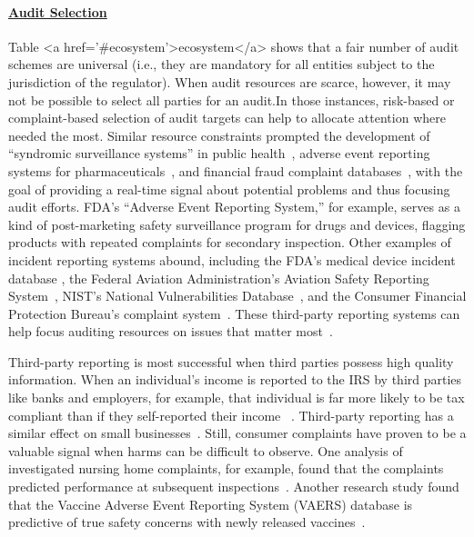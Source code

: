 \documentclass[sigconf]{acmart}
\begin{document}
\paragraph{\underline{Audit Selection}} Table <a href='#ecosystem'>ecosystem</a> shows that a fair number of audit schemes are universal (i.e., they are mandatory for all entities subject to the jurisdiction of the regulator). When audit resources are scarce, however, it may not be possible to select all parties for an audit.In those instances, risk-based or complaint-based selection of audit targets can help to allocate attention where needed the most. Similar resource constraints prompted the development of “syndromic surveillance systems” in public health~\cite{henning2004syndromic}, adverse event reporting systems for pharmaceuticals~\cite{sakaeda2013data}, and financial fraud complaint databases~\cite{littwin2014process}, with the goal of providing a real-time signal about potential problems and thus focusing audit efforts. FDA’s “Adverse Event Reporting System,” for example, serves as a kind of post-marketing safety surveillance program for drugs and devices, flagging products with repeated complaints for secondary inspection. Other examples of incident reporting systems abound, including the FDA’s medical device incident database \cite{maude}, the Federal Aviation Administration’s Aviation Safety Reporting System~\cite{noauthoraviationnodate}, NIST’s National Vulnerabilities Database~\cite{noauthornationalnodate}, and the Consumer Financial Protection Bureau’s complaint system~\cite{plutaso2013}. These third-party reporting systems can help focus auditing resources on issues that matter most~\cite{tatonetti2012novel}.

Third-party reporting is most successful when third parties possess high quality information. When an individual’s income is reported to the IRS by third parties like banks and employers, for example, that individual is far more likely to be tax compliant than if they self-reported their income~ \cite{kleven2011unwilling,johnson2019federal}. Third-party reporting has a similar effect on small businesses~\cite{adhikari2021small}. Still, consumer complaints have proven to be a valuable signal when harms can be difficult to observe. One analysis of investigated nursing home complaints, for example, found that the complaints predicted performance at subsequent inspections~\cite{stevenson2006nursing}. Another research study found that the Vaccine Adverse Event Reporting System (VAERS) database is predictive of true safety concerns with newly released vaccines~\cite{geier2004review}. 
\end{document}
